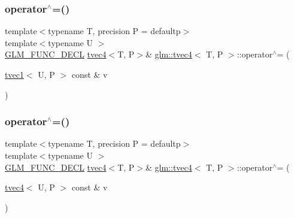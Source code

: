 \subsubsection{\texorpdfstring{operator$^\wedge$=()}{operator^=()}\hspace{0.1cm}{\footnotesize\ttfamily [2/6]}}
{\footnotesize\ttfamily template$<$typename T, precision P = defaultp$>$ \\
template$<$typename U $>$ \\
\mbox{\hyperlink{setup_8hpp_ab2d052de21a70539923e9bcbf6e83a51}{G\+L\+M\+\_\+\+F\+U\+N\+C\+\_\+\+D\+E\+CL}} \mbox{\hyperlink{structglm_1_1tvec4}{tvec4}}$<$T, P$>$\& \mbox{\hyperlink{structglm_1_1tvec4}{glm\+::tvec4}}$<$ T, P $>$\+::operator$^\wedge$= (\begin{DoxyParamCaption}\item[{\mbox{\hyperlink{structglm_1_1tvec1}{tvec1}}$<$ U, P $>$ const \&}]{v }\end{DoxyParamCaption})}

\mbox{\label{structglm_1_1tvec4_a9945b7771ada85b3324781679d9282f5}} 
\subsubsection{\texorpdfstring{operator$^\wedge$=()}{operator^=()}\hspace{0.1cm}{\footnotesize\ttfamily [3/6]}}
{\footnotesize\ttfamily template$<$typename T, precision P = defaultp$>$ \\
template$<$typename U $>$ \\
\mbox{\hyperlink{setup_8hpp_ab2d052de21a70539923e9bcbf6e83a51}{G\+L\+M\+\_\+\+F\+U\+N\+C\+\_\+\+D\+E\+CL}} \mbox{\hyperlink{structglm_1_1tvec4}{tvec4}}$<$T, P$>$\& \mbox{\hyperlink{structglm_1_1tvec4}{glm\+::tvec4}}$<$ T, P $>$\+::operator$^\wedge$= (\begin{DoxyParamCaption}\item[{\mbox{\hyperlink{structglm_1_1tvec4}{tvec4}}$<$ U, P $>$ const \&}]{v }\end{DoxyParamCaption})}

\mbox{\label{structglm_1_1tvec4_a7866bb2f3c4496c7b216f4d9c74b6bf7}} 
